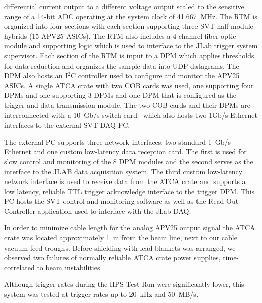 \documentclass[final,3p,times,twocolumn]{elsarticle}
\begin{document}
differential current output to a different voltage output scaled to the sensitive range of a 14-bit ADC 
operating at the system clock of 41.667~MHz. The RTM is organized 
into four sections with each section supporting three SVT half-module hybrids (15 APV25 ASICs). The 
RTM also includes a 4-channel fiber optic module and supporting logic which is used to interface 
to the JLab trigger system supervisor. Each section of the RTM is input to a DPM which applies 
thresholds for data reduction and organizes the sample data into UDP datagrams. The DPM also hosts 
an I$^{2}$C controller used to configure and monitor the APV25 ASICs. A single ATCA crate with two 
COB cards was used, one supporting four DPMs and one supporting 3 DPMs and one DPM that is 
configured as the trigger and data transmission module. The two COB cards and their DPMs are 
interconnected with a 10~Gb/s switch card~\cite{Larsen:2011zb} which also hosts two 1Gb/s Ethernet 
interfaces to the external SVT DAQ PC.  

The external PC supports three network interfaces; two standard 1~Gb/s Ethernet and one custom 
low-latency data reception card. The first is used for slow control and monitoring of the 8 
DPM modules and the second serves as the interface to the JLAB data acquisition system. The third 
custom low-latency network interface is used to receive data from the ATCA crate and supports a low 
latency, reliable TTL trigger acknowledge interface to the trigger DPM. This PC hosts the SVT control 
and monitoring software as well as the Read Out Controller application used to interface with the 
JLab DAQ.

In order to minimize cable length for the analog APV25 output signal the ATCA crate was located 
approximately 1~m from the beam line, next to our cable vacuum feed-troughs.   
Before shielding with lead-blankets was arranged, we observed two failures of normally reliable ATCA 
crate power supplies, time-correlated to beam instabilities. 

Although trigger rates during the HPS Test Run were significantly lower, this system was tested at 
trigger rates up to 20~kHz and 50~MB/s. 
\end{document}

